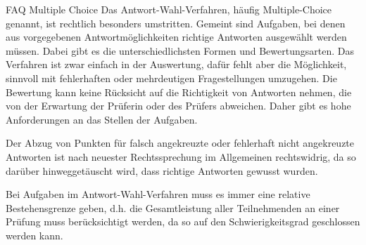 \begin{artikel}{FAQ Multiple Choice}
Das Antwort-Wahl-Verfahren, häufig Multiple-Choice genannt, ist rechtlich besonders umstritten. Gemeint sind Aufgaben, bei denen aus vorgegebenen Antwortmöglichkeiten richtige Antworten ausgewählt werden müssen. Dabei gibt es die unterschiedlichsten Formen und Bewertungsarten. Das Verfahren ist zwar einfach in der Auswertung, dafür fehlt aber die Möglichkeit, sinnvoll mit fehlerhaften oder mehrdeutigen Fragestellungen umzugehen. Die Bewertung kann keine Rücksicht auf die Richtigkeit von Antworten nehmen, die von der Erwartung der Prüferin oder des Prüfers abweichen. Daher gibt es hohe Anforderungen an das Stellen der Aufgaben.

Der Abzug von Punkten für falsch angekreuzte oder fehlerhaft nicht angekreuzte Antworten ist nach neuester Rechtssprechung im Allgemeinen rechtswidrig, da so darüber hinweggetäuscht wird, dass richtige Antworten gewusst wurden.

Bei Aufgaben im Antwort-Wahl-Verfahren muss es immer eine relative Bestehensgrenze geben, d.h. die Gesamtleistung aller Teilnehmenden an einer Prüfung muss berücksichtigt werden, da so auf den Schwierigkeitsgrad geschlossen werden kann.
\end{artikel}
